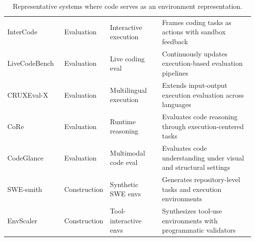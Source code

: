 \documentclass{llmxive}
\begin{document}
\begin{table}[t]
\begin{tabularx}{\textwidth}{p{2.8cm}p{2.0cm}p{3.1cm}X}
InterCode~\cite{yang2023intercode} & Evaluation & Interactive execution & Frames coding tasks as actions with sandbox feedback \\
LiveCodeBench~\cite{jain2024livecodebench} & Evaluation & Live coding eval & Continuously updates execution-based evaluation pipelines \\
CRUXEval-X~\cite{xu2025cruxeval} & Evaluation & Multilingual execution & Extends input-output execution evaluation across languages \\
CoRe~\cite{xie2025core} & Evaluation & Runtime reasoning & Evaluates code reasoning through execution-centered tasks \\
CodeGlance~\cite{wang2026codeglance} & Evaluation & Multimodal code eval & Evaluates code understanding under visual and structural settings \\
SWE-smith~\cite{yang2025swesmithscalingdatasoftware} & Construction & Synthetic SWE envs & Generates repository-level tasks and execution environments \\
EnvScaler~\cite{song2026envscalerscalingtoolinteractiveenvironments} & Construction & Tool-interactive envs & Synthesizes tool-use environments with programmatic validators \\
\bottomrule
\end{tabularx}
\label{tab:code_environment_systems}
\caption{Representative systems where code serves as an environment representation.}
\end{table}
\end{document}
